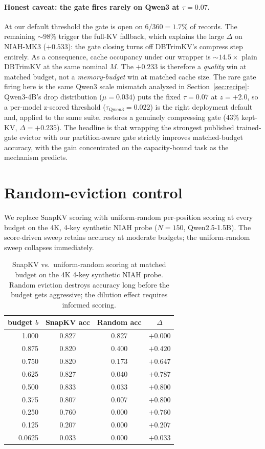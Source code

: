 \documentclass{article}
\begin{document}
\paragraph{Honest caveat: the gate fires rarely on Qwen3 at $\tau = 0.07$.}
At our default threshold the gate is open on $6/360 = 1.7\%$ of
records. The remaining $\sim 98\%$ trigger the full-KV fallback, which
explains the large $\Delta$ on NIAH-MK3 ($+0.533$): the gate closing
turns off DBTrimKV's compress step entirely. As a consequence, cache
occupancy under our wrapper is $\sim 14.5 \times$ plain DBTrimKV at the
same nominal $M$. The $+0.233$ is therefore a \emph{quality} win at
matched budget, not a \emph{memory-budget} win at matched cache size.
The rare gate firing here is the same Qwen3 scale mismatch analyzed in
Section~\ref{sec:recipe}: Qwen3-4B's drop distribution ($\mu = 0.034$)
puts the fixed $\tau = 0.07$ at $z = +2.0$, so a per-model z-scored
threshold ($\tau_{\text{Qwen3}} = 0.022$) is the right deployment
default and, applied to the same suite, restores a genuinely
compressing gate ($43\%$ kept-KV, $\Delta = +0.235$). The headline is that wrapping the strongest
published trained-gate evictor with our partition-aware gate
strictly improves matched-budget accuracy, with the gain concentrated
on the capacity-bound task as the mechanism predicts.


\section{Random-eviction control}
\label{app:random}

We replace SnapKV scoring with uniform-random per-position scoring at every
budget on the 4K, 4-key synthetic NIAH probe ($N = 150$, Qwen2.5-1.5B). The
score-driven sweep retains accuracy at moderate budgets; the uniform-random
sweep collapses immediately.

\begin{table}[h]
\centering
\caption{SnapKV vs.\ uniform-random scoring at matched budget on the 4K
4-key synthetic NIAH probe. Random eviction destroys accuracy long before
the budget gets aggressive; the dilution effect requires informed scoring.}
\label{tab:random-control}
\begin{tabular}{rccc}
\toprule
budget $b$ & SnapKV acc & Random acc & $\Delta$ \\
\midrule
1.000  & 0.827 & 0.827 & $+0.000$ \\
0.875  & 0.820 & 0.400 & $+0.420$ \\
0.750  & 0.820 & 0.173 & $+0.647$ \\
0.625  & 0.827 & 0.040 & $+0.787$ \\
0.500  & 0.833 & 0.033 & $+0.800$ \\
0.375  & 0.807 & 0.007 & $+0.800$ \\
0.250  & 0.760 & 0.000 & $+0.760$ \\
0.125  & 0.207 & 0.000 & $+0.207$ \\
0.0625 & 0.033 & 0.000 & $+0.033$ \\
\bottomrule
\end{tabular}
\end{table}
\end{document}
